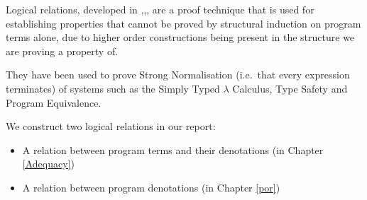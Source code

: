 Logical relations, developed in \citep{Tait67},\citep{Plotkin73},\citep{Statman85}, are a proof technique that is used for establishing properties that cannot be proved by structural induction on program terms alone, due to higher order constructions being present in the structure we are proving a property of.

They have been used to prove Strong Normalisation (i.e.\ that every expression terminates) of systems such as the Simply Typed $\lambda$ Calculus, Type Safety and Program Equivalence.

We construct two logical relations in our report:

\begin{itemize}
\item{A relation between program terms and their denotations (in Chapter \ref{Adequacy})}
\item{A relation between program denotations (in Chapter \ref{por})}
\end{itemize}


%
%
%
%
